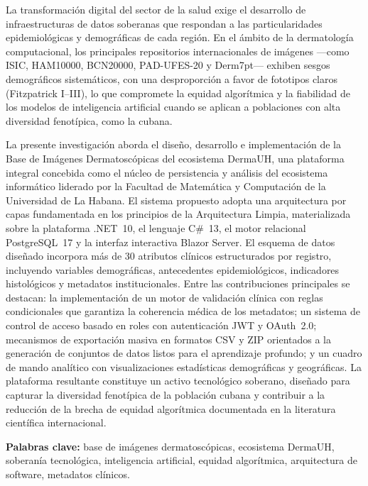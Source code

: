 \begin{resumen}
La transformación digital del sector de la salud exige el desarrollo de infraestructuras de datos soberanas 
que respondan a las particularidades epidemiológicas y demográficas de cada región. En el ámbito de la 
dermatología computacional, los principales repositorios internacionales de imágenes ---como ISIC, 
HAM10000, BCN20000, PAD-UFES-20 y Derm7pt--- exhiben sesgos demográficos sistemáticos, con una 
desproporción a favor de fototipos claros (Fitzpatrick I--III), lo que compromete 
la equidad algorítmica y la fiabilidad de los modelos de inteligencia artificial cuando se aplican a 
poblaciones con alta diversidad fenotípica, como la cubana.

La presente investigación aborda el diseño, desarrollo e implementación de la Base de Imágenes 
Dermatoscópicas del ecosistema DermaUH, una plataforma integral concebida como el núcleo de persistencia 
y análisis del ecosistema informático liderado por la Facultad de Matemática y Computación de la 
Universidad de La Habana. El sistema propuesto adopta una arquitectura por capas fundamentada en 
los principios de la Arquitectura Limpia, materializada sobre la plataforma .NET~10, el lenguaje 
C\#~13, el motor relacional PostgreSQL~17 y la interfaz interactiva Blazor Server. El esquema de 
datos diseñado incorpora más de 30 atributos clínicos estructurados por registro, incluyendo 
variables demográficas, antecedentes epidemiológicos, indicadores histológicos y metadatos 
institucionales.
Entre las contribuciones principales se destacan: la implementación de un motor de validación clínica con 
reglas condicionales que garantiza la coherencia médica de los metadatos; un sistema de control de acceso 
basado en roles con autenticación JWT y OAuth~2.0; mecanismos de exportación masiva en formatos CSV y ZIP 
orientados a la generación de conjuntos de datos listos para el aprendizaje profundo; y un cuadro de mando 
analítico con visualizaciones estadísticas demográficas y geográficas. La plataforma resultante constituye 
un activo tecnológico soberano, diseñado para capturar la diversidad fenotípica de la población cubana y 
contribuir a la reducción de la brecha de equidad algorítmica documentada en la literatura científica 
internacional.

\textbf{Palabras clave:} base de imágenes dermatoscópicas, ecosistema DermaUH, soberanía tecnológica, 
inteligencia artificial, equidad algorítmica, arquitectura de software, metadatos clínicos.
\end{resumen}

